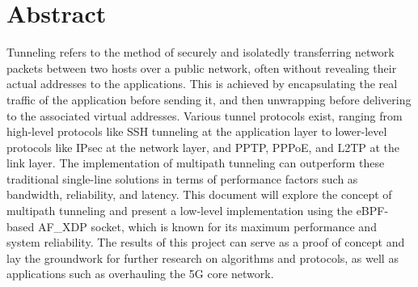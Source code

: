\chapter*{Abstract}

Tunneling refers to the method of securely and isolatedly transferring network packets between two hosts over a public network, often without revealing their actual addresses to the applications. 
This is achieved by encapsulating the real traffic of the application before sending it, and then unwrapping before delivering to the associated virtual addresses.
Various tunnel protocols exist, ranging from high-level protocols like SSH tunneling at the application layer to lower-level protocols like IPsec at the network layer, and PPTP, PPPoE, and L2TP at the link layer.
The implementation of multipath tunneling can outperform these traditional single-line solutions in terms of performance factors such as bandwidth, reliability, and latency.
This document will explore the concept of multipath tunneling and present a low-level implementation using the eBPF-based AF\_XDP socket, which is known for its maximum performance and system reliability.
The results of this project can serve as a proof of concept and lay the groundwork for further research on algorithms and protocols, as well as applications such as overhauling the 5G core network.









